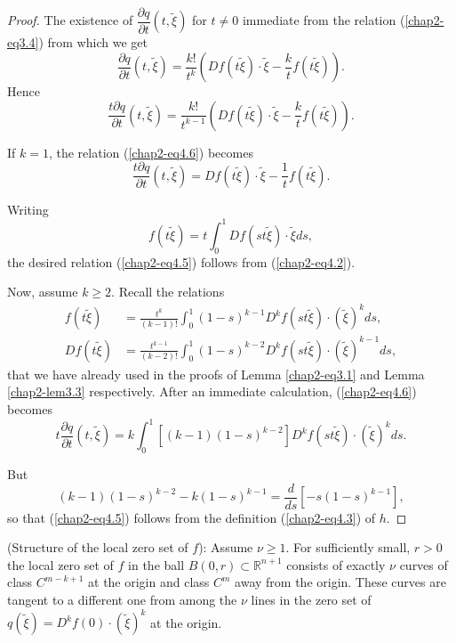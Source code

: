 \begin{proof}
The existence of $\dfrac{\partial q}{\partial t} (t, \widetilde{\xi})$
for $t \neq 0$ immediate from the relation (\ref{chap2-eq3.4}) from
which we get
$$
\frac{\partial q}{\partial t} (t, \widetilde{\xi}) = \frac{k!}{t^{k}}
(Df(t\widetilde{\xi}) \cdot \widetilde{\xi} - \frac{k}{t} f(t\widetilde{\xi})).
$$
Hence
\begin{equation*}
\frac{t\partial q}{\partial t}(t, \widetilde{\xi}) =
\frac{k!}{t^{k-1}} (Df(t\widetilde{\xi}) \cdot \widetilde{\xi} -
\frac{k}{t} f(t\widetilde{\xi})).\tag{4.6}\label{chap2-eq4.6}
\end{equation*}

If $k = 1$, the relation (\ref{chap2-eq4.6}) becomes
$$
\frac{t\partial q}{\partial t} (t, \widetilde{\xi}) =
Df(t\widetilde{\xi}) \cdot \widetilde{\xi} - \frac{1}{t} f(t\widetilde{\xi}).
$$

Writing
$$
f(t\widetilde{\xi}) = t\int_{0}^{1} Df(st\widetilde{\xi}) \cdot
\widetilde{\xi} ds,
$$
the desired relation (\ref{chap2-eq4.5}) follows from
(\ref{chap2-eq4.2}).

Now, assume $k \geq 2$. Recall the relations
\begin{align*}
f(t \widetilde{\xi}) & = \frac{t^{k}}{(k-1)!} \int_{0}^{1} (1-s)^{k-1}
D^{k}f(st\widetilde{\xi}) \cdot (\widetilde{\xi})^{k} ds,\\
Df(t\widetilde{\xi}) & = \frac{t^{k-1}}{(k-2)!} \int_{0}^{1}
(1-s)^{k-2} D^{k}f(st\widetilde{\xi}) \cdot (\widetilde{\xi})^{k-1} ds,
\end{align*}
that we have already used in the proofs of Lemma \ref{chap2-eq3.1} and
Lemma \ref{chap2-lem3.3} respectively. After an immediate calculation,
(\ref{chap2-eq4.6}) becomes
$$
t \frac{\partial q}{\partial t} (t, \widetilde{\xi}) = k \int_{0}^{1}
[(k-1)(1-s)^{k-2}] D^{k}f(st\widetilde{\xi}) \cdot
(\widetilde{\xi})^{k} ds.
$$\pageoriginale

But
$$
(k-1)(1-s)^{k-2} - k(1-s)^{k-1} = \frac{d}{ds} \left[-s(1-s)^{k-1} \right],
$$
so that (\ref{chap2-eq4.5}) follows from the definition
(\ref{chap2-eq4.3}) of $h$.
\end{proof}

\begin{theorem}\label{chap2-thm4.1}
(Structure of the local zero set of $f$): Assume $\nu \geq 1$. For
  sufficiently small, $r > 0$ the local zero set of $f$ in the ball
  $B(0, r) \subset \mathbb{R}^{n+1}$ consists of exactly $\nu$ curves
  of class $C^{m-k+1}$ at the origin and class $C^{m}$ away from the
  origin. These curves are tangent to a different one from among the
  $\nu$ lines in the zero set of $q(\widetilde{\xi}) = D^{k}f(0) \cdot
  (\widetilde{\xi})^{k}$ at the origin.
\end{theorem}

